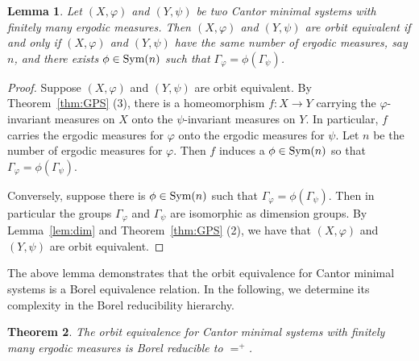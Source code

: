 \documentclass{amsart}
\newtheorem{theorem}{Theorem}[section]
\newtheorem{lemma}[theorem]{Lemma}
\theoremstyle{definition}
\theoremstyle{problem}
\theoremstyle{remark}
\numberwithin{equation}{section}
\begin{document}
\begin{lemma}\label{lem:OEkey}
Let  $(X,\varphi)$ and $(Y,\psi)$ be two Cantor minimal systems with finitely many ergodic measures. Then  $(X,\varphi)$ and $(Y,\psi)$ are orbit equivalent if and only if $(X,\varphi)$ and $(Y,\psi)$ have the same number of  ergodic measures, say $n$,  and there exists $\phi \in \mbox{\rm Sym}(n)$ such that $\Gamma_{\varphi}=\phi(\Gamma_{\psi})$.
\end{lemma}
\begin{proof} Suppose $(X, \varphi)$ and $(Y, \psi)$ are orbit equivalent. By Theorem~\ref{thm:GPS} (3), there is a homeomorphism $f\colon X\to Y$ carrying the $\varphi$-invariant measures on $X$ onto the $\psi$-invariant measures on $Y$. In particular, $f$ carries the ergodic measures for $\varphi$ onto the ergodic measures for $\psi$. Let $n$ be the number of ergodic measures for $\varphi$. Then $f$ induces a $\phi\in \mbox{\rm Sym}(n)$ so that $\Gamma_\varphi=\phi(\Gamma_\psi)$.

Conversely, suppose there is $\phi\in\mbox{\rm Sym}(n)$ such that $\Gamma_\varphi=\phi(\Gamma_\psi)$. Then in particular the groups $\Gamma_\varphi$ and $\Gamma_\psi$ are isomorphic as dimension groups. By Lemma~\ref{lem:dim} and Theorem~\ref{thm:GPS} (2), we have that $(X, \varphi)$ and $(Y, \psi)$ are orbit equivalent.
\end{proof}

The above lemma demonstrates that the orbit equivalence for Cantor minimal systems is a Borel equivalence relation. In the following, we determine its complexity in the Borel reducibility hierarchy.


\begin{theorem}  The orbit equivalence for Cantor minimal systems with finitely many ergodic measures is Borel reducible to $=^+$.
\end{theorem}
\end{document}
